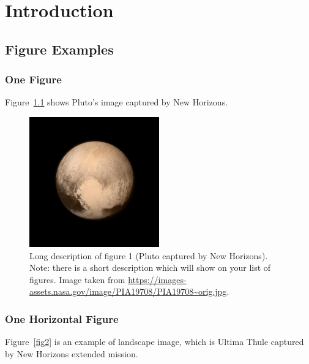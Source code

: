 \chapter{Introduction}
\label{chap:intro}
\section{Figure Examples}
\subsection{One Figure}
Figure~\ref{fig1} shows Pluto's image captured by New Horizons. 
\begin{figure}[htb!]
\center
\includegraphics[width=0.5\textwidth]{figures/PIA19708-orig.jpg}
\caption[Shot description of the figure 1.1.]{Long description of figure 1 (Pluto captured by New Horizons). Note: there is a short description which will show on your list of figures. Image taken from \url{https://images-assets.nasa.gov/image/PIA19708/PIA19708~orig.jpg}.}
\label{fig1}
\end{figure}

\subsection{One Horizontal Figure}
Figure~\ref{fig2} is an example of landscape image, which is Ultima Thule captured by New Horizons extended mission.


